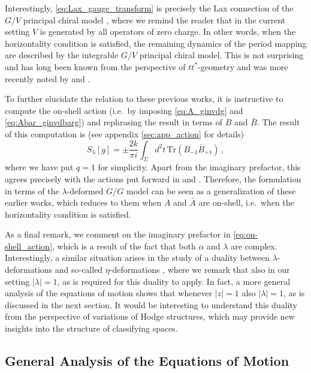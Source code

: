 \documentclass[11pt,a4paper]{article}
\numberwithin{equation}{section}
\numberwithin{table}{section}\setlength{\multlinegap}{25pt}
\begin{document}
Interestingly, \eqref{eq:Lax_gauge_transform} is precisely the Lax connection of the $G/V$ principal chiral model \cite{Hollowood:2014}, where we remind the reader that in the current setting $V$ is generated by all operators of zero charge. In other words, when the horizontality condition is satisfied, the remaining dynamics of the period mapping are described by the integrable $G/V$ principal chiral model. This is not surprising and has long been known from the perspective of $tt^*$-geometry \cite{Cecotti:1991me,Cecotti:2020rjq} and was more recently noted by \cite{Cecotti:2020uek} and \cite{Grimm:2020cda}.

To further elucidate the relation to these previous works, it is instructive to compute the on-shell action (i.e.~by imposing \eqref{eq:A_ginvdg} and \eqref{eq:Abar_ginvdbarg}) and rephrasing the result in terms of $B$ and $\bar{B}$. The result of this computation is (see appendix \ref{sec:app_action} for details)
\begin{equation}\label{eq:on-shell_action}
	S_\lambda[g] = \pm \frac{2k}{\pi i}\int_\Sigma d^2t \,\mathrm{Tr}\left(B_{-1}\bar{B}_{+1}\right)\,,
\end{equation}
where we have put $q=1$ for simplicity. Apart from the imaginary prefactor, this agrees precisely with the actions put forward in \cite{Cecotti:2020uek} and \cite{Grimm:2020cda,Grimm:2021ikg}. Therefore, the formulation in terms of the $\lambda$-deformed $G/G$ model can be seen as a generalization of these earlier works, which reduces to them when $A$ and $\bar{A}$ are on-shell, i.e.~when the horizontality condition is satisfied. 

As a final remark, we comment on the imaginary prefactor in \eqref{eq:on-shell_action}, which is a result of the fact that both $\alpha$ and $\lambda$ are complex. Interestingly, a similar situation arises in the study of a duality between $\lambda$-deformations and so-called $\eta$-deformations \cite{Klimcik_2015}, where we remark that also in our setting $|\lambda|=1$, as is required for this duality to apply. In fact, a more general analysis of the equations of motion shows that whenever $|z|=1$ also $|\lambda|=1$, as is discussed in the next section. It would be interesting to understand this duality from the perspective of variations of Hodge structures, which may provide new insights into the structure of classifying spaces. 


\subsection{General Analysis of the Equations of Motion}
\end{document}
